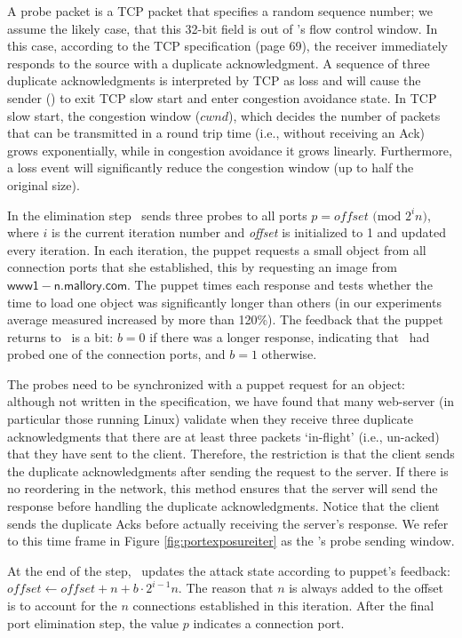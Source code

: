 \documentclass[conference]{IEEEtran}
\newcommand{\cwnd}{$\textit{cwnd}$}
\newcommand{\malcoman}{\mbox{$\mathsf{www1-n.mallory.com}$}}
\begin{document}
A probe packet is a TCP packet that specifies a random sequence number; we assume the likely case, that this 32-bit field is out of \wini's flow control window. In this case, according to the TCP specification \cite{rfc793} (page 69), the receiver immediately responds to the source with a duplicate acknowledgment. A sequence of three duplicate acknowledgments is interpreted by TCP as loss and will cause the sender (\lin) to exit TCP slow start and enter congestion avoidance state. In TCP slow start, the congestion window (\cwnd), which decides the number of packets that can be transmitted in a round trip time (i.e., without receiving an Ack) grows exponentially, while in congestion avoidance it grows linearly. Furthermore, a loss event will significantly reduce the congestion window (up to half the original size).

In the elimination step \mal\ sends three probes to all ports $p = \textit{offset} \text{ (mod $2^in$)}$, where $i$ is the current iteration number and \textit{offset} is initialized to 1 and updated every iteration. In each iteration, the puppet requests a small object from all connection ports that she established, this by requesting an image from \malcoman. The puppet times each response and tests whether the time to load one object was significantly longer than others (in our experiments average measured increased by more than 120\%). The feedback that the puppet returns to \mal\ is a bit: $b = 0$ if there was a longer response, indicating that \mal\ had probed one of the connection ports, and $b = 1$ otherwise. 

The probes need to be synchronized with a puppet request for an object: although not written in the specification, we have found that many web-server (in particular those running Linux) validate when they receive three duplicate acknowledgments that there are at least three packets `in-flight' (i.e., un-acked) that they have sent to the client. Therefore, the restriction is that the client sends the duplicate acknowledgments after sending the request to the server. If there is no reordering in the network, this method ensures that the server will send the response before handling the duplicate acknowledgments. Notice that the client sends the duplicate Acks before actually receiving the server's response. We refer to this time frame in Figure \ref{fig:portexposureiter} as the \mal's probe sending window.

At the end of the step, \mal\ updates the attack state according to puppet's feedback: $\textit{offset} \leftarrow \textit{offset} + n + b \cdot 2^{i-1} n$. The reason that $n$ is always added to the offset is to account for the $n$ connections established in this iteration. After the final port elimination step, the value $p$ indicates a connection port.
\end{document}
